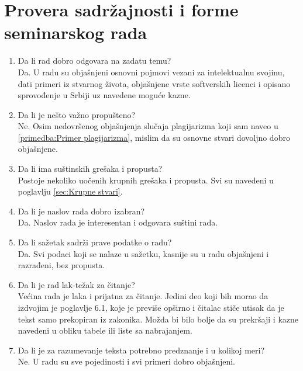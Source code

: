 \documentclass[a4paper]{report}
\begin{document}
\clearpage

\section{Provera sadržajnosti i forme seminarskog rada}

\begin{enumerate}
\item Da li rad dobro odgovara na zadatu temu?\\
    Da. U radu su objašnjeni osnovni pojmovi vezani za intelektualnu svojinu, dati primeri iz stvarnog života, objašnjene vrste softverskih licenci i opisano sprovođenje u Srbiji uz navedene moguće kazne.
    
\item Da li je nešto važno propušteno?\\
    Ne. Osim nedovršenog objašnjenja slučaja plagijarizma koji sam naveo u \ref{primedba:Primer plagijarizma}, mislim da su osnovne stvari dovoljno dobro objašnjene.
    
\item Da li ima suštinskih grešaka i propusta?\\
    Postoje nekoliko uočenih krupnih grešaka i propusta. Svi su navedeni u poglavlju \ref{sec:Krupne stvari}.
    
\item Da li je naslov rada dobro izabran?\\
    Da. Naslov rada je interesentan i odgovara suštini rada.

\item Da li sažetak sadrži prave podatke o radu?\\
    Da. Svi podaci koji se nalaze u sažetku, kasnije su u radu objašnjeni i razrađeni, bez propusta.

\item Da li je rad lak-težak za čitanje?\\
    Većina rada je laka i prijatna za čitanje. Jedini deo koji bih morao da izdvojim je poglavlje 6.1, koje je previše opširno i čitalac stiče utisak da je tekst samo prekopiran iz zakonika. Možda bi bilo bolje da su prekršaji i kazne navedeni u obliku tabele ili liste sa nabrajanjem.

\item Da li je za razumevanje teksta potrebno predznanje i u kolikoj meri?\\
    Ne. U radu su sve pojedinosti i svi primeri dobro objašnjeni.


\end{enumerate}
\end{document}
